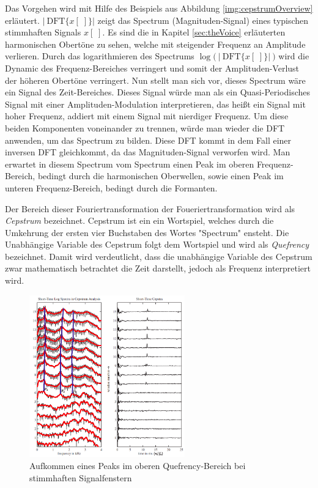Das Vorgehen wird mit Hilfe des Beispiels aus Abbildung \ref{img:cepstrumOverview} erläutert. $ |\ \text{DFT}\{x[\;]\} \big| $  zeigt das Spectrum (Magnituden-Signal) eines \glqq typischen stimmhaften\grqq{} Signals $x[\;]$. Es sind die in Kapitel \ref{sec:theVoice} erläuterten harmonischen Obertöne zu sehen, welche mit steigender Frequenz an Amplitude verlieren. Durch das logarithmieren des Spectrums $\log \Big(\ \big|\ \text{DFT}\{x[\;]\} \big|\ \Big)$ wird die Dynamic des Frequenz-Bereiches verringert und somit der Amplituden-Verlust der höheren Obertöne verringert. Nun stellt man sich vor, dieses Spectrum wäre ein Signal des Zeit-Bereiches. Dieses Signal würde man als ein Quasi-Periodisches Signal mit einer Amplituden-Modulation interpretieren, das heißt ein Signal mit hoher Frequenz, addiert mit einem Signal mit nierdiger Frequenz. Um diese beiden Komponenten voneinander zu trennen, würde man wieder die DFT anwenden, um das Spectrum zu bilden. Diese DFT kommt in dem Fall einer inversen DFT gleichkommt, da das Magnituden-Signal verworfen wird. Man erwartet in diesem \glqq Spectrum vom Spectrum\grqq{} einen Peak im \glqq oberen Frequenz-Bereich\grqq , bedingt durch die harmonischen Oberwellen, sowie einen Peak im  \glqq unteren Frequenz-Bereich\grqq, bedingt durch die Formanten.\cite[Cepstral analysis]{ricardo_ceps}

Der Bereich dieser \glqq Fouriertransformation der Foueriertransformation\grqq{} wird als \emph{Cepstrum} bezeichnet. Cepstrum ist ein ein Wortspiel, welches durch die Umkehrung der ersten vier Buchstaben des Wortes "Spectrum" ensteht. Die Unabhängige Variable des Cepstrum folgt dem Wortspiel und wird als \emph{Quefrency} bezeichnet. Damit wird verdeutlicht, dass die unabhängige Variable des Cepstrum zwar mathematisch betrachtet die Zeit darstellt, jedoch als Frequenz interpretiert wird.\cite[S. 7]{ricardo_ceps}

\begin{figure}[h]
	\centering
	\includegraphics[width=0.6\textwidth]{bilder/cepstrum05.png}
	\caption{Aufkommen eines Peaks im oberen Quefrency-Bereich bei stimmhaften Signalfenstern \cite[Cepstral Analysis, S. 17]{ricardo_ceps}}
	\label{img:cepstrumVoicedPeak}
\end{figure}	

